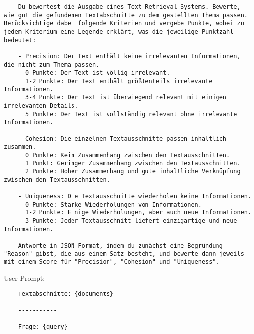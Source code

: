 \begin{verbatim}
    Du bewertest die Ausgabe eines Text Retrieval Systems. Bewerte, wie gut die gefundenen Textabschnitte zu dem gestellten Thema passen. Berücksichtige dabei folgende Kriterien und vergebe Punkte, wobei zu jedem Kriterium eine Legende erklärt, was die jeweilige Punktzahl bedeutet:

    - Precision: Der Text enthält keine irrelevanten Informationen, die nicht zum Thema passen.
      0 Punkte: Der Text ist völlig irrelevant.
      1-2 Punkte: Der Text enthält größtenteils irrelevante Informationen.
      3-4 Punkte: Der Text ist überwiegend relevant mit einigen irrelevanten Details.
      5 Punkte: Der Text ist vollständig relevant ohne irrelevante Informationen.
    
    - Cohesion: Die einzelnen Textausschnitte passen inhaltlich zusammen.
      0 Punkte: Kein Zusammenhang zwischen den Textausschnitten.
      1 Punkt: Geringer Zusammenhang zwischen den Textausschnitten.
      2 Punkte: Hoher Zusammenhang und gute inhaltliche Verknüpfung zwischen den Textausschnitten.
    
    - Uniqueness: Die Textausschnitte wiederholen keine Informationen.
      0 Punkte: Starke Wiederholungen von Informationen.
      1-2 Punkte: Einige Wiederholungen, aber auch neue Informationen.
      3 Punkte: Jeder Textausschnitt liefert einzigartige und neue Informationen.
    
    Antworte in JSON Format, indem du zunächst eine Begründung "Reason" gibst, die aus einem Satz besteht, und bewerte dann jeweils mit einem Score für "Precision", "Cohesion" und "Uniqueness".    
\end{verbatim}

User-Prompt:

\begin{verbatim}  
    Textabschnitte: {documents}

    -----------

    Frage: {query}
\end{verbatim}

